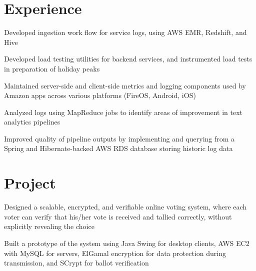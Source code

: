 \documentclass[]{deedy-resume-openfont}
\begin{document}
\begin{minipage}[t]{0.64\textwidth} 

\smallgap
\gap
\gap
\section{Experience}

\vspace{\topsep} %
\begin{tightemize}
\item Developed ingestion work flow for service logs, using AWS EMR, Redshift, and Hive
\item Developed load testing utilities for backend services, and instrumented load tests in preparation of holiday peaks
\item Maintained server-side and client-side metrics and logging components used by Amazon apps across various platforms (FireOS, Android, iOS)
\end{tightemize}
\sectionsep

\begin{tightemize}
\item Analyzed logs using MapReduce jobs to identify areas of improvement in text analytics pipelines
\item Improved quality of pipeline outputs by implementing and querying from a Spring and Hibernate-backed AWS RDS database storing historic log data
\end{tightemize}
\sectionsep


\section{Project}
\descript{}
\begin{tightemize}
\item Designed a scalable, encrypted, and verifiable online voting system, where each voter can verify that his/her vote is received and tallied correctly, without explicitly revealing the choice
\item Built a prototype of the system using Java Swing for desktop clients, AWS EC2 with MySQL for servers, ElGamal encryption for data protection during transmission, and SCrypt for ballot verification
\end{tightemize}
\sectionsep


\end{minipage}
\end{document}
